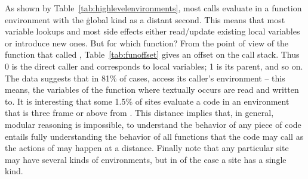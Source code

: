 \documentclass[review,nonacm,screen,acmsmall,anonymous=true]{acmart}
\begin{document}
\noindent
As shown by Table~\ref{tab:highlevelenvironments}, most calls evaluate in a
function environment with the \c{global} kind as a distant second. This means
that most variable lookups and most side effects either read/update existing
local variables or introduce new ones. But for which function? From the point of
view of the function that called \eval, Table~\ref{tab:funoffset} gives an
offset on the call stack. Thus 0 is the direct caller and corresponds to local variables; 1 is its parent, and so on. The data suggests that in 81\% of cases, \eval access its caller's environment -- this means, the variables of the function where \eval textually
occurs are read and written to. It is interesting that some 1.5\% of sites
evaluate a code in an environment that is three frame or above from \eval. This
distance implies that, in general, modular reasoning is impossible, to
understand the behavior of any piece of code entails fully understanding the
behavior of all functions that the code may call as the actions of \eval may
happen at a distance. Finally note that any particular site may have several
kinds of environments, but in \packageNbOneCategoryEnvirSitePercent of the case a
site has a single kind.
\end{document}
